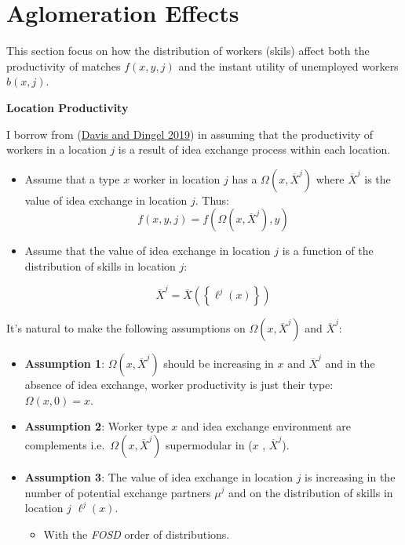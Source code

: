 \documentclass[
  letterpaper,
  DIV=11,
  numbers=noendperiod]{scrartcl}
\providecommand{\tightlist}{%
  \setlength{\itemsep}{0pt}\setlength{\parskip}{0pt}}\usepackage{longtable,booktabs,array}
\begin{document}
\hypertarget{aglomeration-effects}{%
\section{Aglomeration Effects}\label{aglomeration-effects}}

This section focus on how the distribution of workers (skils) affect
both the productivity of matches \(f(x,y,j)\) and the instant utility of
unemployed workers \(b(x,j)\).

\textbf{Location Productivity}

I borrow from
(\protect\hyperlink{ref-davisSpatialKnowledgeEconomy2019}{Davis and
Dingel 2019}) in assuming that the productivity of workers in a location
\(j\) is a result of idea exchange process within each location.

\begin{itemize}
\item
  Assume that a type \(x\) worker in location \(j\) has a
  \(\Omega(x, \overline{X}^j)\) where \(\overline{X}^j\) is the value of
  idea exchange in location \(j\). Thus:
  \[f(x,y,j) = f\left(\Omega(x, \overline{X}^j), y\right)\]
\item
  Assume that the value of idea exchange in location \(j\) is a function
  of the distribution of skills in location \(j\):

  \[ \overline{X}^j = \overline{X}\left(\left\{\ell^j(x)\right\}\right) \]
\end{itemize}

It's natural to make the following assumptions on
\(\Omega(x, \overline{X}^j)\) and \(\overline{X}^j\):

\begin{itemize}
\tightlist
\item
  \textbf{Assumption 1}: \(\Omega(x, \overline{X}^j)\) should be
  increasing in \(x\) and \(\overline{X}^j\) and in the absence of idea
  exchange, worker productivity is just their type:
  \(\Omega(x, 0) = x\).
\item
  \textbf{Assumption 2}: Worker type \(x\) and idea exchange environment
  are complements i.e.~\(\Omega(x, \overline{X}^j)\) supermodular in
  (\(x\) , \(\overline{X}^j\)).
\item
  \textbf{Assumption 3}: The value of idea exchange in location \(j\) is
  increasing in the number of potential exchange partners \(\mu^j\) and
  on the distribution of skills in location \(j\) \(\ell^j(x)\).

  \begin{itemize}
  \tightlist
  \item
    With the \emph{FOSD} order of distributions.
  \end{itemize}
\end{itemize}
\end{document}
